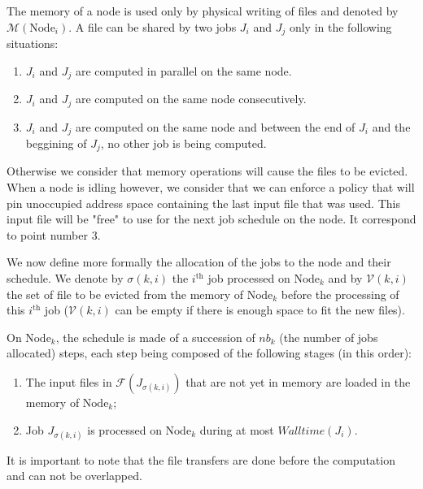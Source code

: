 \documentclass[a4paper]{article}
\newcommand{\Node}[1]{\ensuremath{\mathrm{Node}_{#1}}\xspace}
\newcommand{\inputs}{\ensuremath{\mathcal{F}}\xspace}
\newcommand{\memory}{\ensuremath{\mathcal{M}}\xspace}
\newcommand{\walltime}{\mathit{Walltime}\xspace}
\newcommand{\evict}{\ensuremath{\mathcal{V}}\xspace}
\newcommand{\live}{\ensuremath{L}\xspace}
\begin{document}
The memory of a node is used only by physical writing of files and denoted by $\memory(\Node{i})$.
A file can be shared by two jobs $J_i$ and $J_j$ only in the following situations:
\begin{enumerate}
	\item $J_i$ and $J_j$ are computed in parallel on the same node.
	\item $J_i$ and $J_j$ are computed on the same node consecutively.
	\item $J_i$ and $J_j$ are computed on the same node and between the end of $J_i$ and the beggining of $J_j$, no other job is being computed.
\end{enumerate}
Otherwise we consider that memory operations will cause the files to be evicted.
When a node is idling however, we consider that we can enforce a policy that will
pin unoccupied address space containing the last input file that was used.
This input file will be "free" to use for the next job schedule on the node. It correspond to point number 3.

We now define more formally the allocation of the jobs to the node and
their schedule.
We denote by $\sigma(k,i)$ the $i^\text{th}$ job
processed on $\Node{k}$ and by $\evict(k,i)$ the set of file to
be evicted from the memory of $\Node{k}$ before the processing
of this $i^\text{th}$ job ($\evict(k,i)$ can be empty if there is enough space to fit the new files).

On $\Node{k}$, the schedule is made of a
succession of $\mathit{nb}_k$ (the number of jobs allocated) steps, each step being composed of the
following stages (in this order):
\begin{enumerate}
\item The input files in $\inputs(J_{\sigma(k,i)})$ that are not yet in memory are loaded in the memory of $\Node{k}$;
\item Job $J_{\sigma(k,i)}$ is processed on $\Node{k}$ during at most $\walltime(J_i)$.
\end{enumerate}
It is important to note that the file transfers are done before the computation and can not be overlapped.

\end{document}
